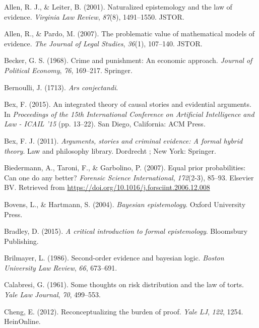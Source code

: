 \documentclass[11pt,dvipsnames,enabledeprecatedfontcommands]{scrartcl}
\begin{document}
\leavevmode\hypertarget{ref-allen2001naturalized}{}%
Allen, R. J., \& Leiter, B. (2001). Naturalized epistemology and the law
of evidence. \emph{Virginia Law Review}, \emph{87}(8), 1491--1550.
JSTOR.

\leavevmode\hypertarget{ref-allen2007problematic}{}%
Allen, R., \& Pardo, M. (2007). The problematic value of mathematical
models of evidence. \emph{The Journal of Legal Studies}, \emph{36}(1),
107--140. JSTOR.

\leavevmode\hypertarget{ref-becker1968crime}{}%
Becker, G. S. (1968). Crime and punishment: An economic approach.
\emph{Journal of Political Economy}, \emph{76}, 169--217. Springer.

\leavevmode\hypertarget{ref-Bernoulli1713Ars-conjectandi}{}%
Bernoulli, J. (1713). \emph{Ars conjectandi}.

\leavevmode\hypertarget{ref-bex2015IntegratedTheoryCausal}{}%
Bex, F. (2015). An integrated theory of causal stories and evidential
arguments. In \emph{Proceedings of the 15th International Conference on
Artificial Intelligence and Law - ICAIL '15} (pp. 13--22). San Diego,
California: ACM Press.

\leavevmode\hypertarget{ref-bex2011ArgumentsStoriesCriminal}{}%
Bex, F. J. (2011). \emph{Arguments, stories and criminal evidence: A
formal hybrid theory}. Law and philosophy library. Dordrecht ; New York:
Springer.

\leavevmode\hypertarget{ref-Biedermann2007equal}{}%
Biedermann, A., Taroni, F., \& Garbolino, P. (2007). Equal prior
probabilities: Can one do any better? \emph{Forensic Science
International}, \emph{172}(2-3), 85--93. Elsevier BV. Retrieved from
\url{https://doi.org/10.1016/j.forsciint.2006.12.008}

\leavevmode\hypertarget{ref-bovens2004bayesian}{}%
Bovens, L., \& Hartmann, S. (2004). \emph{Bayesian epistemology}. Oxford
University Press.

\leavevmode\hypertarget{ref-bradley2015critical}{}%
Bradley, D. (2015). \emph{A critical introduction to formal
epistemology}. Bloomsbury Publishing.

\leavevmode\hypertarget{ref-brilmayer1986}{}%
Brilmayer, L. (1986). Second-order evidence and bayesian logic.
\emph{Boston University Law Review}, \emph{66}, 673--691.

\leavevmode\hypertarget{ref-Calabresi1961}{}%
Calabresi, G. (1961). Some thoughts on risk distribution and the law of
torts. \emph{Yale Law Journal}, \emph{70}, 499--553.

\leavevmode\hypertarget{ref-cheng2012reconceptualizing}{}%
Cheng, E. (2012). Reconceptualizing the burden of proof. \emph{Yale LJ},
\emph{122}, 1254. HeinOnline.
\end{document}
